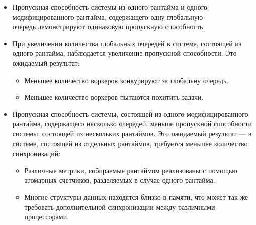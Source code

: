 \begin{itemize}
    \item Пропускная способность системы из одного рантайма и одного модифицированного рантайма, содержащего одну глобальную очередь,демонстрируют одинаковую пропускную способность.
    \item При увеличении количества глобальных очередей в системе, состоящей из одного рантайма, наблюдается увеличение пропускной способности. Это ожидаемый результат:
    \begin{itemize}
        \item Меньшее количество воркеров конкурируют за глобальну очередь.
        \item Меньшее количество воркеров пытаются похитить задачи.
    \end{itemize}
    \item Пропускная способность системы, состоящей из одного модифицированного рантайма, содержащего несколько очередей, меньше пропускной способности системы, состоящей из нескольких рантаймов. Это ожидаемый результат --- в системе, состоящей из отдельных рантаймов, требуется меньшее количество синхронизаций:
    \begin{itemize}
        \item Различные метрики, собираемые рантаймом реализованы с помощью атомарных счетчиков, разделяемых в случае одного рантайма.
        \item Многие структуры данных находятся близко в памяти, что может так же требовать дополнительной синхронизации между различными процессорами.
    \end{itemize}
\end{itemize}
